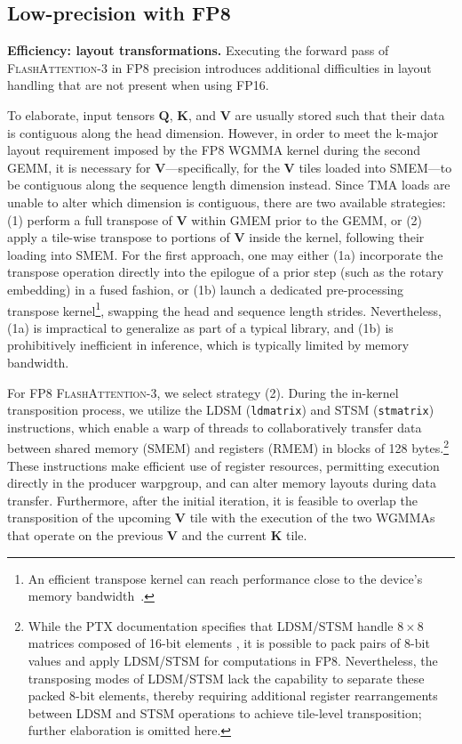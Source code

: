 \subsection{Low-precision with FP8}
\label{sec:algofp8}

\textbf{Efficiency: layout transformations.} Executing the forward pass of \textsc{FlashAttention-3} in FP8 precision introduces additional difficulties in layout handling that are not present when using FP16.

To elaborate, input tensors $\mathbf{Q}$, $\mathbf{K}$, and $\mathbf{V}$
are usually stored such that their data is contiguous along the head dimension. However, in order to meet the k-major layout requirement imposed by the FP8 WGMMA kernel during the second GEMM, it is necessary for $\mathbf{V}$—specifically, for the $\mathbf{V}$ tiles loaded into SMEM—to be contiguous along the sequence length dimension instead. Since TMA loads are unable to alter which dimension is contiguous, there are two available strategies: (1) perform a full transpose of $\mathbf{V}$ within GMEM prior to the GEMM, or (2) apply a tile-wise transpose to portions of $\mathbf{V}$ inside the kernel, following their loading into SMEM. For the first approach, one may either (1a) incorporate the transpose operation directly into the epilogue of a prior step (such as the rotary embedding) in a fused fashion, or (1b) launch a dedicated pre-processing transpose kernel\footnote{An efficient transpose kernel can reach performance close to the device's memory bandwidth~\citep{colfax_cutlass_transpose_2024}.}, swapping the head and sequence length strides. Nevertheless, (1a) is impractical to generalize as part of a typical library, and (1b) is prohibitively inefficient in inference, which is typically limited by memory bandwidth.

For FP8 \textsc{FlashAttention-3}, we select strategy (2). During the in-kernel transposition process, we utilize the LDSM (\verb|ldmatrix|) and STSM (\verb|stmatrix|) instructions, which enable a warp of threads to collaboratively transfer data between shared memory (SMEM) and registers (RMEM) in blocks of 128 bytes.\footnote{While the PTX documentation specifies that LDSM/STSM handle $8 \times 8$ matrices composed of 16-bit elements \cite[\S 9.7.13.4.15-16]{ptx}, it is possible to pack pairs of 8-bit values and apply LDSM/STSM for computations in FP8. Nevertheless, the transposing modes of LDSM/STSM lack the capability to separate these packed 8-bit elements, thereby requiring additional register rearrangements between LDSM and STSM operations to achieve tile-level transposition; further elaboration is omitted here.} These instructions make efficient use of register resources, permitting execution directly in the producer warpgroup, and can alter memory layouts during data transfer. Furthermore, after the initial iteration, it is feasible to overlap the transposition of the upcoming $\mathbf{V}$ tile with the execution of the two WGMMAs that operate on the previous $\mathbf{V}$ and the current $\mathbf{K}$ tile.

